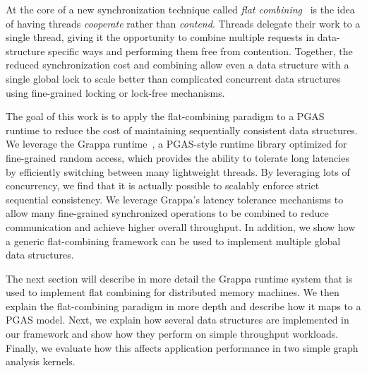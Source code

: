 At the core of a new synchronization technique called \emph{flat combining}~\cite{flatCombining} is the idea of having threads \emph{cooperate} rather than \emph{contend}.
Threads delegate their work to a single thread, giving it the opportunity to combine multiple requests in data-structure specific ways and performing them free from contention.
Together, the reduced synchronization cost and combining allow even a data structure with a single global lock to scale better than complicated concurrent data structures using fine-grained locking or lock-free mechanisms.

The goal of this work is to apply the flat-combining paradigm to a PGAS runtime to reduce the cost of maintaining sequentially consistent data structures.
We leverage the Grappa runtime~\cite{Nelson:hotpar11-real}, a PGAS-style runtime library optimized for fine-grained random access, which provides the ability to tolerate long latencies by efficiently switching between many lightweight threads.
By leveraging lots of concurrency, we find that it is actually possible to scalably enforce strict sequential consistency. We leverage Grappa's latency tolerance mechanisms to allow many fine-grained synchronized operations to be combined to reduce communication and achieve higher overall throughput.
In addition, we show how a generic flat-combining framework can be used to implement multiple global data structures.

The next section will describe in more detail the Grappa runtime system that is used to implement flat combining for distributed memory machines. We then explain the flat-combining paradigm in more depth and describe how it maps to a PGAS model. Next, we explain how several data structures are implemented in our framework and show how they perform on simple throughput workloads. Finally, we evaluate how this affects application performance in two simple graph analysis kernels.
